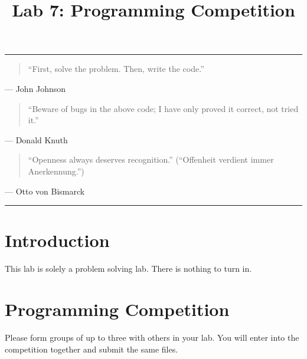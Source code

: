 \documentclass[11pt]{cselabheader}
\title{Lab 7: Programming Competition}
\theoremstyle{plain}
\begin{document}
\maketitle

\hrule

\begin{quotation}
  ``First, solve the problem. Then, write the code.''
\end{quotation}
\begin{flushright}
  --- John Johnson
\end{flushright}

\begin{quotation} ``Beware of bugs in the above code; I have only proved it
  correct, not tried it.''
\end{quotation}
\begin{flushright}
  --- Donald Knuth
\end{flushright}

\begin{quotation}
  ``Openness always deserves recognition.'' (``Offenheit verdient immer
  Anerkennung.'')
\end{quotation}
\begin{flushright}
  --- Otto von Bismarck

\end{flushright}

\hrule

\pagebreak

\section{Introduction}
This lab is solely a problem solving lab. There is nothing to turn in.

\section{Programming Competition}
Please form groups of up to three with others in your lab. You will
enter into the competition together and submit the same files.
\end{document}
